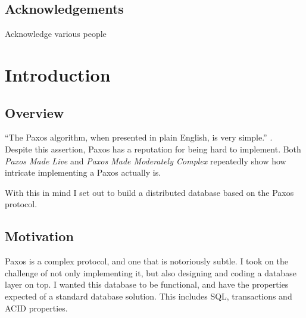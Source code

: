 \documentclass[12pt,twoside,notitlepage]{report}
\begin{document}
\tableofcontents

\listoffigures

\newpage
\section*{Acknowledgements}

Acknowledge various people


\cleardoublepage        %

\setcounter{page}{1}
\pagestyle{headings}

\chapter{Introduction}

\section{Overview}

``The Paxos algorithm, when presented in plain English, is very simple.'' \cite{lamport01}. \\
Despite this assertion, Paxos has a reputation for being hard to implement. Both
\emph{Paxos Made Live} \cite{chandra07} and \emph{Paxos Made Moderately Complex} \cite{renesse11}
repeatedly show how intricate implementing a Paxos actually is.

With this in mind I set out to build a distributed database based on the Paxos protocol.


\section{Motivation}

Paxos is a complex protocol, and one that is notoriously subtle. I took on the challenge of not
only implementing it, but also designing and coding a database layer on top. I wanted this
database to be functional, and have the properties expected of a standard database solution. This
includes SQL, transactions and ACID properties.
\end{document}
